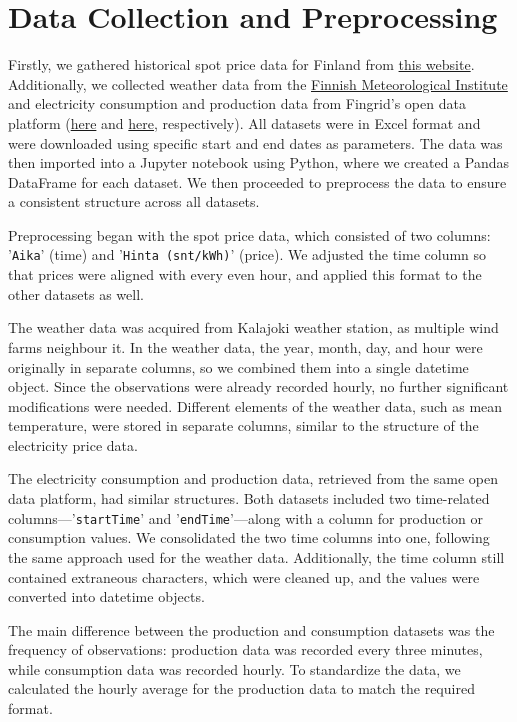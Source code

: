 \documentclass{article}
\numberwithin{equation}{section}
\begin{document}
\clearpage
\section{Data Collection and Preprocessing}
Firstly, we gathered historical spot price data for Finland from \href{https://porssisahko.net/tilastot}{this website}. Additionally, we collected weather data from the \href{https://www.ilmatieteenlaitos.fi/avoin-data/}{Finnish Meteorological Institute} and electricity consumption and production data from Fingrid's open data platform (\href{https://data.fingrid.fi/en/datasets/124}{here} and \href{https://data.fingrid.fi/en/datasets/192}{here}, respectively). All datasets were in Excel format and were downloaded using specific start and end dates as parameters. The data was then imported into a Jupyter notebook using Python, where we created a Pandas DataFrame for each dataset. We then proceeded to preprocess the data to ensure a consistent structure across all datasets.

Preprocessing began with the spot price data, which consisted of two columns: '\verb|Aika|' (time) and '\verb|Hinta (snt/kWh)|' (price). We adjusted the time column so that prices were aligned with every even hour, and applied this format to the other datasets as well. 

The weather data was acquired from Kalajoki weather station, as multiple wind farms neighbour it. In the weather data, the year, month, day, and hour were originally in separate columns, so we combined them into a single datetime object. Since the observations were already recorded hourly, no further significant modifications were needed. Different elements of the weather data, such as mean temperature, were stored in separate columns, similar to the structure of the electricity price data.

The electricity consumption and production data, retrieved from the same open data platform, had similar structures. Both datasets included two time-related columns—'\verb|startTime|' and '\verb|endTime|'—along with a column for production or consumption values. We consolidated the two time columns into one, following the same approach used for the weather data. Additionally, the time column still contained extraneous characters, which were cleaned up, and the values were converted into datetime objects.

The main difference between the production and consumption datasets was the frequency of observations: production data was recorded every three minutes, while consumption data was recorded hourly. To standardize the data, we calculated the hourly average for the production data to match the required format.
\end{document}
